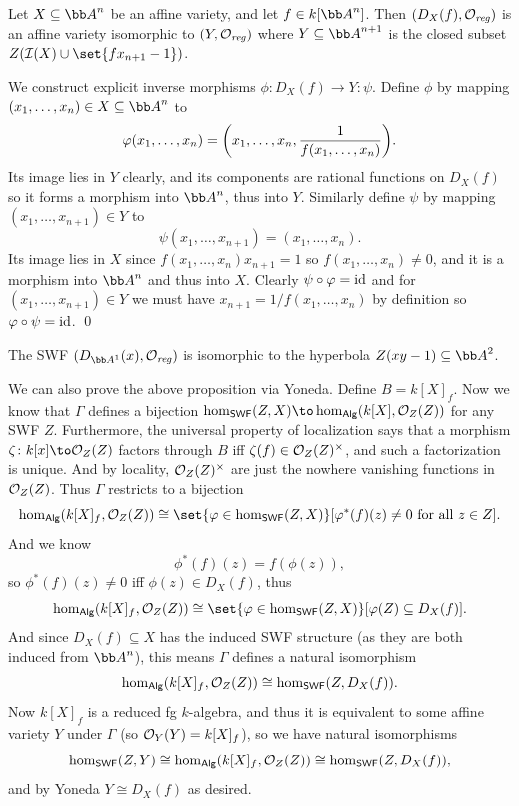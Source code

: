\bprop

    Let $X\subseteq\bA^n$ be an affine variety, and let $f\in k[\bA^n]$.
    Then $(D_X(f),{{\cal O}}_{\it reg})$ is an affine variety isomorphic to $(Y,{{\cal O}}_{\it reg})$ where $Y\subseteq\bA^{n+1}$ is the closed subset $Z(\I(X)\cup\set{fx_{n+1}-1})$.

\eprop

\bproof

    We construct explicit inverse morphisms $\phi\colon D_X(f)\to Y\colon\psi$.
    Define $\phi$ by mapping $(x_1,\dots,x_n)\in X\subseteq\bA^n$ to
    $$ \varphi(x_1,\dots,x_n) = \mathopen{}\mathclose{\left(x_1,\dots,x_n,{{1}\over{f(x_1,\dots,x_n)}}\right)} . $$
    Its image lies in $Y$ clearly, and its components are rational functions on $D_X(f)$ so it forms a morphism into $\bA^n$, thus into $Y$.
    Similarly define $\psi$ by mapping $(x_1,\dots,x_{n+1})\in Y$ to
    $$ \psi(x_1,\dots,x_{n+1}) = (x_1,\dots,x_n) . $$
    Its image lies in $X$ since $f(x_1,\dots,x_n)x_{n+1}=1$ so $f(x_1,\dots,x_n)\neq0$, and it is a morphism into $\bA^n$ and thus into $X$.
    Clearly $\psi\circ\varphi={\rm id}$ and for $(x_1,\dots,x_{n+1})\in Y$ we must have $x_{n+1}=1/f(x_1,\dots,x_n)$ by definition so $\varphi\circ\psi={\rm id}$.
    \qed

\eproof

\bexam

    The SWF $(D_{\bA^1}(x),\O_\reg)$ is isomorphic to the hyperbola $Z(xy-1)\subseteq\bA^2$.

\eexam

We can also prove the above proposition via Yoneda.
Define $B=k[X]_f$.
Now we know that $\Gamma$ defines a bijection $\hom_\SWF(Z,X)\to\hom_\Alg(k[X],\O_Z(Z))$ for any SWF $Z$.
Furthermore, the universal property of localization says that a morphism $\zeta\colon k[x]\to\O_Z(Z)$ factors through $B$ iff $\zeta(f)\in{{\cal O}}_Z(Z)^\times$, and such a factorization is unique.
And by locality, ${{\cal O}}_Z(Z)^\times$ are just the nowhere vanishing functions in ${{\cal O}}_Z(Z)$.
Thus $\Gamma$ restricts to a bijection
$$ \hom_\Alg(k[X]_f,\O_Z(Z)) \cong \set{\phi\in\hom_\SWF(Z,X)}[\phi^*(f)(z)\neq0\hbox{ for all $z\in Z$}] . $$
And we know
$$ \phi^*(f)(z) = f(\phi(z)) , $$
so $\phi^*(f)(z)\neq0$ iff $\phi(z)\in D_X(f)$, thus
$$ \hom_\Alg(k[X]_f,\O_Z(Z)) \cong \set{\phi\in\hom_\SWF(Z,X)}[\phi(Z)\subseteq D_X(f)] . $$
And since $D_X(f)\subseteq X$ has the induced SWF structure (as they are both induced from $\bA^n$), this means $\Gamma$ defines a natural isomorphism
$$ \hom_{\sf Alg}(k[X]_f,{{\cal O}}_Z(Z)) \cong \hom_{\sf SWF}(Z,D_X(f)) . $$
Now $k[X]_f$ is a reduced fg $k$-algebra, and thus it is equivalent to some affine variety $Y$ under $\Gamma$ (so ${{\cal O}}_Y(Y)=k[X]_f$), so we have natural isomorphisms
$$ \hom_{\sf SWF}(Z,Y) \cong \hom_{\sf Alg}(k[X]_f,{{\cal O}}_Z(Z)) \cong \hom_{\sf SWF}(Z,D_X(f)) , $$
and by Yoneda $Y\cong D_X(f)$ as desired.

